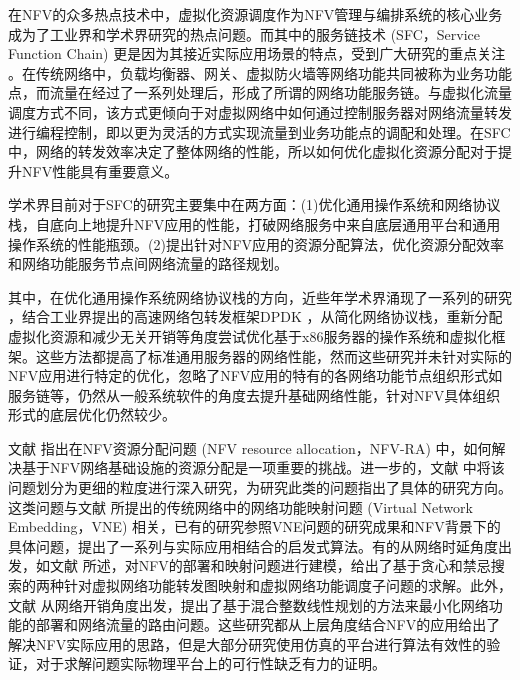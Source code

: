 
在NFV的众多热点技术中，虚拟化资源调度作为NFV管理与编排系统的核心业务成为了工业界和学术界研究的热点问题。而其中的服务链技术 (SFC，Service Function Chain) 更是因为其接近实际应用场景的特点，受到广大研究的重点关注 \cite{zave2017dynamic,kulkarni2017nfvnice,mijumbi2016network} 。在传统网络中，负载均衡器、网关、虚拟防火墙等网络功能共同被称为业务功能点，而流量在经过了一系列处理后，形成了所谓的网络功能服务链。与虚拟化流量调度方式不同，该方式更倾向于对虚拟网络中如何通过控制服务器对网络流量转发进行编程控制，即以更为灵活的方式实现流量到业务功能点的调配和处理。在SFC中，网络的转发效率决定了整体网络的性能，所以如何优化虚拟化资源分配对于提升NFV性能具有重要意义。
	
学术界目前对于SFC的研究主要集中在两方面：(1)优化通用操作系统和网络协议栈，自底向上地提升NFV应用的性能，打破网络服务中来自底层通用平台和通用操作系统的性能瓶颈。(2)提出针对NFV应用的资源分配算法，优化资源分配效率和网络功能服务节点间网络流量的路径规划。

其中，在优化通用操作系统网络协议栈的方向，近些年学术界涌现了一系列的研究 \cite{rizzo2012netmap,ram2013hyper,belay2014ix,hwang2015netvm,yasukata2016stackmap,prekas2017zygos} ，结合工业界提出的高速网络包转发框架DPDK \cite{intel2015data} ，从简化网络协议栈，重新分配虚拟化资源和减少无关开销等角度尝试优化基于x86服务器的操作系统和虚拟化框架。这些方法都提高了标准通用服务器的网络性能，然而这些研究并未针对实际的NFV应用进行特定的优化，忽略了NFV应用的特有的各网络功能节点组织形式如服务链等，仍然从一般系统软件的角度去提升基础网络性能，针对NFV具体组织形式的底层优化仍然较少。

文献  指出在NFV资源分配问题 (NFV resource allocation，NFV-RA) 中，如何解决基于NFV网络基础设施的资源分配是一项重要的挑战。进一步的，文献  中将该问题划分为更细的粒度进行深入研究，为研究此类的问题指出了具体的研究方向。这类问题与文献  所提出的传统网络中的网络功能映射问题 (Virtual Network Embedding，VNE) 相关，已有的研究参照VNE问题的研究成果和NFV背景下的具体问题，提出了一系列与实际应用相结合的启发式算法。有的从网络时延角度出发，如文献  所述，对NFV的部署和映射问题进行建模，给出了基于贪心和禁忌搜索的两种针对虚拟网络功能转发图映射和虚拟网络功能调度子问题的求解。此外，文献  从网络开销角度出发，提出了基于混合整数线性规划的方法来最小化网络功能的部署和网络流量的路由问题。这些研究都从上层角度结合NFV的应用给出了解决NFV实际应用的思路，但是大部分研究使用仿真的平台进行算法有效性的验证，对于求解问题实际物理平台上的可行性缺乏有力的证明。

